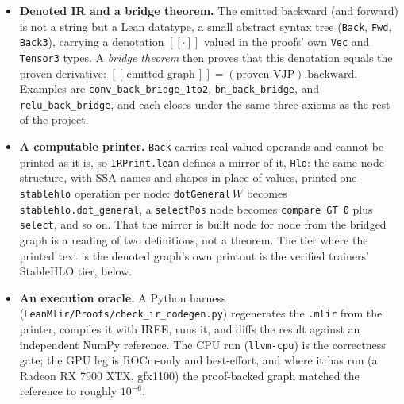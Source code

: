 \begin{itemize}
  \item \textbf{Denoted IR and a bridge theorem.} The emitted backward (and
    forward) is not a string but a Lean datatype, a small abstract syntax
    tree (\texttt{Back}, \texttt{Fwd}, \texttt{Back3}), carrying a
    denotation $[\![\cdot]\!]$ valued in the proofs' own \texttt{Vec} and
    \texttt{Tensor3} types. A \emph{bridge theorem} then proves that this
    denotation equals the proven derivative: $[\![\,\text{emitted
    graph}\,]\!] = (\text{proven VJP}).\mathrm{backward}$. Examples are
    \texttt{conv\_back\_bridge\_1to2}, \texttt{bn\_back\_bridge}, and
    \texttt{relu\_back\_bridge}, and each closes under the same three axioms
    as the rest of the project.
  \item \textbf{A computable printer.} \texttt{Back} carries real-valued
    operands and cannot be printed as it is, so \texttt{IRPrint.lean} defines
    a mirror of it, \texttt{Hlo}: the same node structure, with SSA names and
    shapes in place of values, printed one \texttt{stablehlo} operation per
    node: \texttt{dotGeneral}\,$W$ becomes
    \texttt{stablehlo.dot\_general}, a \texttt{selectPos} node becomes
    \texttt{compare GT 0} plus \texttt{select}, and so on. That the mirror
    is built node for node from the bridged graph is a reading of two
    definitions, not a theorem. The tier where the printed text is the
    denoted graph's own printout is the verified trainers' StableHLO tier,
    below.
  \item \textbf{An execution oracle.} A Python harness
    (\texttt{LeanMlir/Proofs/check\_ir\_codegen.py}) regenerates the
    \texttt{.mlir} from the printer, compiles it with IREE, runs it, and
    diffs the result against an independent NumPy reference. The CPU run
    (\texttt{llvm-cpu}) is the correctness gate; the GPU leg is ROCm-only
    and best-effort, and where it has run (a Radeon RX 7900 XTX, gfx1100)
    the proof-backed graph matched the reference to roughly $10^{-6}$.
\end{itemize}

